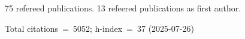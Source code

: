 75 refereed publications. 13 refeered publications as first author.

Total citations~=~5052; h-index~=~37 (2025-07-26)
